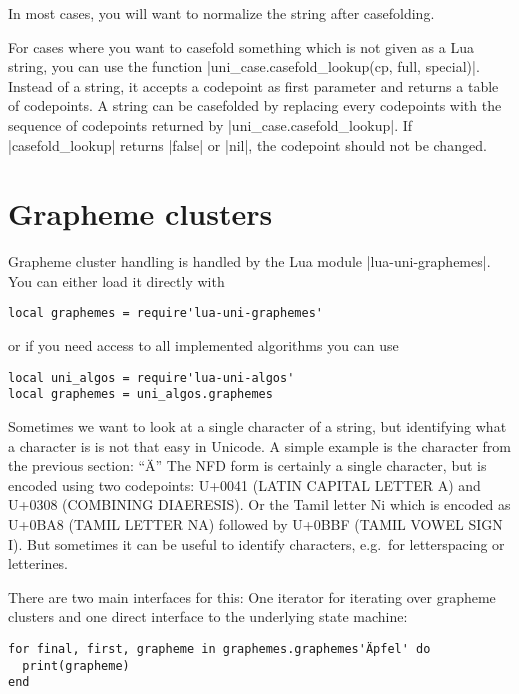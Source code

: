 \documentclass{article}
\begin{document}
In most cases, you will want to normalize the string after casefolding.

For cases where you want to casefold something which is not given as a Lua string, you can use the function |uni_case.casefold_lookup(cp, full, special)|. Instead of a string, it accepts a codepoint as first parameter and returns a table of codepoints. A string can be casefolded by replacing every codepoints with the sequence of codepoints returned by |uni_case.casefold_lookup|. If |casefold_lookup| returns |false| or |nil|, the codepoint should not be changed.

\section{Grapheme clusters}
Grapheme cluster handling is handled by the Lua module |lua-uni-graphemes|.
You can either load it directly with
\begin{verbatim}
local graphemes = require'lua-uni-graphemes'
\end{verbatim}
or if you need access to all implemented algorithms you can use
\begin{verbatim}
local uni_algos = require'lua-uni-algos'
local graphemes = uni_algos.graphemes
\end{verbatim}

Sometimes we want to look at a single character of a string, but identifying what a character is is not that easy in Unicode. A simple example is the character from the previous section: ``Ä''
The NFD form is certainly a single character, but is encoded using two codepoints: U+0041 (LATIN CAPITAL LETTER A) and U+0308 (COMBINING DIAERESIS). Or the Tamil letter Ni which is encoded as U+0BA8 (TAMIL LETTER NA) followed by U+0BBF (TAMIL VOWEL SIGN I). But sometimes it can be useful to identify characters, e.g.\ for letterspacing or letterines.

There are two main interfaces for this: One iterator for iterating over grapheme clusters and one direct interface to the underlying state machine:

\begin{verbatim}
for final, first, grapheme in graphemes.graphemes'Äpfel' do
  print(grapheme)
end
\end{verbatim}
\end{document}
